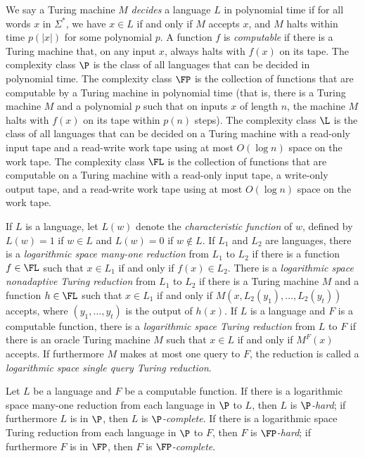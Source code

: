 \documentclass{article}
\begin{document}
We say a Turing machine $M$ \emph{decides} a language $L$ in polynomial time if for all words $x$ in $\Sigma^*$, we have $x \in L$ if and only if $M$ accepts $x$, and $M$ halts within time $p(|x|)$ for some polynomial $p$.
A function $f$ is \emph{computable} if there is a Turing machine that, on any input $x$, always halts with $f(x)$ on its tape.
The complexity class $\P$ is the class of all languages that can be decided in polynomial time.
The complexity class $\FP$ is the collection of functions that are computable by a Turing machine in polynomial time (that is, there is a Turing machine $M$ and a polynomial $p$ such that on inputs $x$ of length $n$, the machine $M$ halts with $f(x)$ on its tape within $p(n)$ steps).
The complexity class $\L$ is the class of all languages that can be decided on a Turing machine with a read-only input tape and a read-write work tape using at most $O(\log n)$ space on the work tape.
The complexity class $\FL$ is the collection of functions that are computable on a Turing machine with a read-only input tape, a write-only output tape, and a read-write work tape using at most $O(\log n)$ space on the work tape.

If $L$ is a language, let $L(w)$ denote the \emph{characteristic function} of $w$, defined by $L(w) = 1$ if $w \in L$ and $L(w) = 0$ if $w \notin L$.
If $L_1$ and $L_2$ are languages, there is a \emph{logarithmic space many-one reduction} from $L_1$ to $L_2$ if there is a function $f \in \FL$ such that $x \in L_1$ if and only if $f(x) \in L_2$.
There is a \emph{logarithmic space nonadaptive Turing reduction} from $L_1$ to $L_2$ if there is a Turing machine $M$ and a function $h \in \FL$ such that $x \in L_1$ if and only if $M(x, L_2(y_1), \dotsc, L_2(y_t))$ accepts, where $(y_1, \dotsc, y_t)$ is the output of $h(x)$.
If $L$ is a language and $F$ is a computable function, there is a \emph{logarithmic space Turing reduction} from $L$ to $F$ if there is an oracle Turing machine $M$ such that $x \in L$ if and only if $M^F(x)$ accepts.
If furthermore $M$ makes at most one query to $F$, the reduction is called a \emph{logarithmic space single query Turing reduction}.

Let $L$ be a language and $F$ be a computable function.
If there is a logarithmic space many-one reduction from each language in $\P$ to $L$, then $L$ is \emph{$\P$-hard}; if furthermore $L$ is in $\P$, then $L$ is \emph{$\P$-complete}.
If there is a logarithmic space Turing reduction from each language in $\P$ to $F$, then $F$ is \emph{$\FP$-hard}; if furthermore $F$ is in $\FP$, then $F$ is \emph{$\FP$-complete}.
\end{document}
